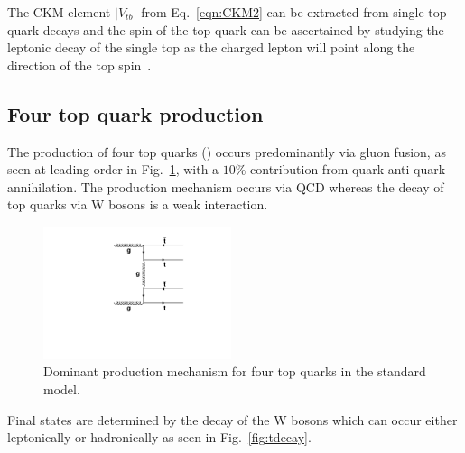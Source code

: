The CKM element $|V_{tb}|$ from Eq.~\ref{eqn:CKM2} can be extracted from single top quark decays and the spin of the top quark can be ascertained by studying the leptonic decay of the single top as the charged lepton will point along the direction of the top spin~\cite{Boos:2012hi}.
\subsection{Four top quark production}

The production of four top quarks (\tttt) occurs predominantly via gluon fusion, as seen at leading order in Fig.~\ref{fig:ttttAtLO}, with a $10\%$ contribution from quark-anti-quark annihilation. The production mechanism occurs via QCD whereas the decay of top quarks via W bosons is a weak interaction. 

\begin{figure}[ht!]
\begin{center}
    \includegraphics[width=0.49\textwidth]{images/Theory/tttt_t_LO.pdf}
    \caption{Dominant production mechanism for four top quarks in the standard model.}
    \label{fig:ttttAtLO}
\end{center}
\end{figure}

Final states are determined by the decay of the W bosons which can occur either leptonically or hadronically as seen in Fig.~\ref{fig:tdecay}. 


